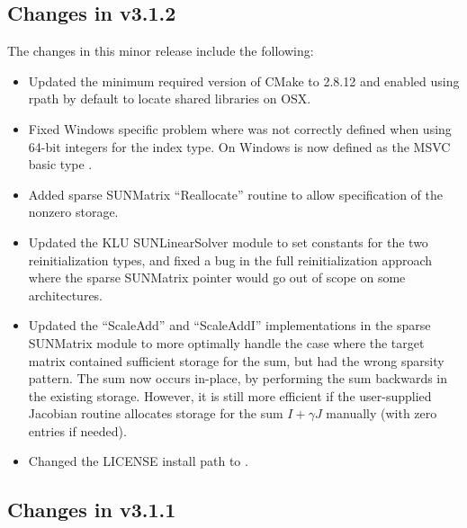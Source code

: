 \subsection*{Changes in v3.1.2}

The changes in this minor release include the following:
\begin{itemize}
\item Updated the minimum required version of CMake to 2.8.12 and enabled
  using rpath by default to locate shared libraries on OSX.
\item Fixed Windows specific problem where  was not correctly
  defined when using 64-bit integers for the {\sundials} index type. On Windows
   is now defined as the MSVC basic type .
\item Added sparse SUNMatrix ``Reallocate'' routine to allow specification of
  the nonzero storage.
\item Updated the KLU SUNLinearSolver module to set constants for the two
  reinitialization types, and fixed a bug in the full reinitialization
  approach where the sparse SUNMatrix pointer would go out of scope on
  some architectures.
\item Updated the ``ScaleAdd'' and ``ScaleAddI'' implementations in the
  sparse SUNMatrix module to more optimally handle the case where the
  target matrix contained sufficient storage for the sum, but had the
  wrong sparsity pattern.  The sum now occurs in-place, by performing
  the sum backwards in the existing storage.  However, it is still more
  efficient if the user-supplied Jacobian routine allocates storage for
  the sum $I+\gamma J$ manually (with zero entries if needed).
\item Changed the LICENSE install path to .
\end{itemize}

\subsection*{Changes in v3.1.1}

